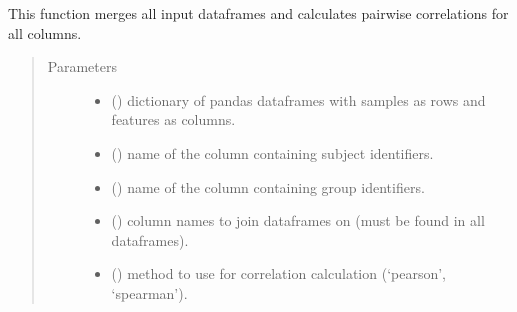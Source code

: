 \documentclass[letterpaper,10pt,english]{sphinxmanual}
\begin{document}
\begin{fulllineitems}
\label{\detokenize{_autosummary/analytics_core.analytics:analytics_core.analytics.analytics.run_multi_correlation}}
This function merges all input dataframes and calculates pairwise correlations for all columns.
\begin{quote}\begin{description}
\item[{Parameters}] \leavevmode\begin{itemize}
\item {} 
 () \textendash{} dictionary of pandas dataframes with samples as rows and features as columns.

\item {} 
 () \textendash{} name of the column containing subject identifiers.

\item {} 
 () \textendash{} name of the column containing group identifiers.

\item {} 
 () \textendash{} column names to join dataframes on (must be found in all dataframes).

\item {} 
 () \textendash{} method to use for correlation calculation (‘pearson’, ‘spearman’).


\end{itemize}
\end{description}
\end{quote}
\end{fulllineitems}
\end{document}
